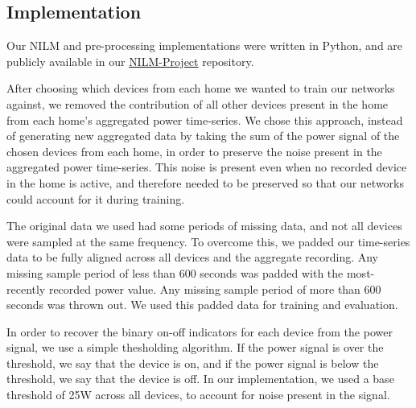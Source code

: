 \documentclass{article}
\begin{document}








\subsection{Implementation}
Our NILM and pre-processing implementations were written in Python, and are publicly available in our \href{https://github.com/CMPUT-466-551-ML-Project/NILM-Project}{NILM-Project} repository.

After choosing which devices from each home we wanted to train our networks against, we removed the contribution of all other devices present in the home from each home's aggregated power time-series.
We chose this approach, instead of generating new aggregated data by taking the sum of the power signal of the chosen devices from each home, in order to preserve the noise present in the aggregated power time-series.
This noise is present even when no recorded device in the home is active, and therefore needed to be preserved so that our networks could account for it during training.

The original data we used had some periods of missing data, and not all devices were sampled at the same frequency.
To overcome this, we padded our time-series data to be fully aligned across all devices and the aggregate recording.
Any missing sample period of less than 600 seconds was padded with the most-recently recorded power value.
Any missing sample period of more than 600 seconds was thrown out.
We used this padded data for training and evaluation.

In order to recover the binary on-off indicators for each device from the power signal, we use a simple thesholding algorithm.
If the power signal is over the threshold, we say that the device is on, and if the power signal is below the threshold, we say that the device is off.
In our implementation, we used a base threshold of 25W across all devices, to account for noise present in the signal.
\end{document}
